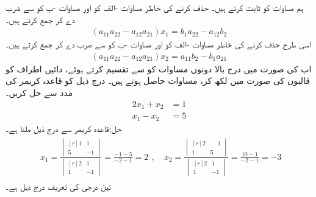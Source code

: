 ہم مساوات  کو ثابت کرتے ہیں۔   حذف کرنے کی خاطر مساوات -الف کو  اور مساوات -ب کو  سے ضرب دے کر جمع کرتے ہیں۔
\begin{align*}
(a_{11}a_{22}-a_{12}a_{21})x_1=b_1a_{22}-a_{12}b_2
\end{align*} 
اسی طرح  حذف کرنے کی خاطر  مساوات -الف کو  اور مساوات -ب کو  سے ضرب دے کر جمع کرتے ہیں۔
\begin{align*}
(a_{11}a_{22}-a_{12}a_{21})x_2=a_{11}b_2-b_1a_{21}
\end{align*}
اب  کی صورت میں درج بالا دونوں مساوات کو  سے  تقسیم کرتے ہوئے، دائیں اطراف کو قالبوں کی صورت میں لکھ کر،  مساوات  حاصل ہوتے ہیں۔
درج ذیل کو قاعدہ کریمر کی مدد سے حل کریں۔
\begin{align*}
2x_1+x_2&=1\\
x_1-x_2&=5
\end{align*}
حل:قاعدہ کریمر سے درج ذیل ملتا ہے۔
\begin{gather*}
\begin{aligned}
x_1=\frac{\begin{vmatrix*}[r] 1&1\\5&-1 \end{vmatrix*}}{\begin{vmatrix*}[r] 2&1\\1&-1 \end{vmatrix*}}=\frac{-1-5}{-2-1}=2
\end{aligned},\quad
x_2=\frac{\begin{vmatrix*}[r] 2&\phantom{-}1\\1&5 \end{vmatrix*}}{\begin{vmatrix*}[r]  2&1\\1&-1\end{vmatrix*}}=\frac{10-1}{-2-1}=-3
\end{gather*} 
تین درجی  کی تعریف درج ذیل ہے۔

